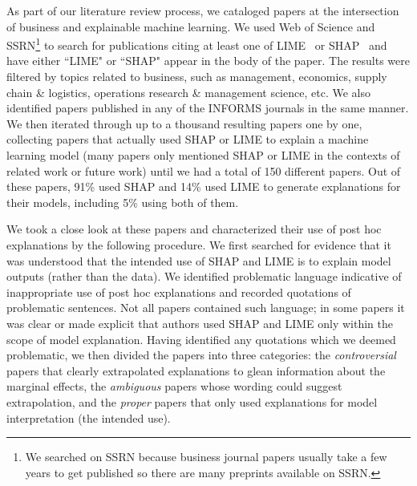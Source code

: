 \documentclass[12pt]{article}  %
\begin{document}
        As part of our literature review process, we cataloged papers at the intersection of business and explainable machine learning. We used Web of Science and SSRN\footnote{We searched on SSRN because business journal papers usually take a few years to get published so there are many preprints available on SSRN.} to search for publications citing at least one of LIME~\citep{ribeiro16lime} or SHAP~\citep{lundberg17shap} and have either ``LIME" or ``SHAP" appear in the body of the paper. The results were filtered by topics related to business, such as management, economics, supply chain \& logistics, operations research \& management science, etc. We also identified papers published in any of the INFORMS journals in the same manner. We then iterated through up to a thousand resulting papers one by one, collecting papers that actually used SHAP or LIME to explain a machine learning model (many papers only mentioned SHAP or LIME in the contexts of related work or future work) until we had a total of 150 different papers. Out of these papers, 91\% used SHAP and 14\% used LIME to generate explanations for their models, including 5\% using both of them.

        
        We took a close look at these papers and characterized their use of post hoc explanations by the following procedure. We first searched for evidence that it was understood that the intended use of SHAP and LIME is to explain model outputs (rather than the data). We identified problematic language indicative of inappropriate use of post hoc explanations and recorded quotations of problematic sentences.
        Not all papers contained such language; in some papers it was clear or made explicit that authors used SHAP and LIME only within the scope of model explanation. Having identified any quotations which we deemed problematic, we then divided the papers into three categories: the \textit{controversial} papers that clearly extrapolated explanations to glean information about the marginal effects, the \textit{ambiguous} papers whose wording could suggest extrapolation, and the \textit{proper} papers that only used explanations for model interpretation (the intended use).%
\end{document}
